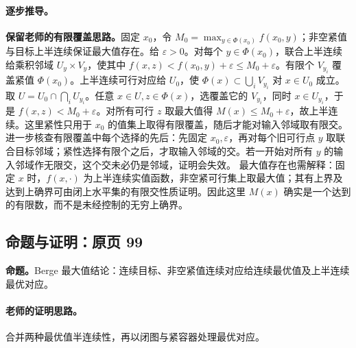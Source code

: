 \documentclass[11pt,a4paper]{article}
\newcommand{\eps}{\varepsilon}
\theoremstyle{definition}\newtheorem{definition}{定义}\newtheorem{example}{例}
\begin{document}
\paragraph{逐步推导。}\textbf{保留老师的有限覆盖思路。}固定 $x_0$，令 $M_0=\max_{y\in\Phi(x_0)}f(x_0,y)$；非空紧值与目标上半连续保证最大值存在。给 $\eps>0$。对每个 $y\in\Phi(x_0)$，联合上半连续给乘积邻域 $U_y\times V_y$，使其中 $f(x,z)<f(x_0,y)+\eps\le M_0+\eps$。有限个 $V_{y_i}$ 覆盖紧值 $\Phi(x_0)$。上半连续可行对应给 $U_0$，使 $\Phi(x)\subset\bigcup_iV_{y_i}$ 对 $x\in U_0$ 成立。取 $U=U_0\cap\bigcap_iU_{y_i}$。任意 $x\in U,z\in\Phi(x)$，选覆盖它的 $V_{y_i}$，同时 $x\in U_{y_i}$，于是 $f(x,z)<M_0+\eps$。对所有可行 $z$ 取最大值得 $M(x)\le M_0+\eps$，故上半连续。这里紧性只用于 $x_0$ 的值集上取得有限覆盖，随后才能对输入邻域取有限交。
进一步核查有限覆盖中每个选择的先后：先固定 $x_0,\eps$，再对每个旧可行点 $y$ 取联合目标邻域；紧性选择有限个之后，才取输入邻域的交。若一开始对所有 $y$ 的输入邻域作无限交，这个交未必仍是邻域，证明会失效。
最大值存在也需解释：固定 $x$ 时，$f(x,\cdot)$ 为上半连续实值函数，非空紧可行集上取最大值；其有上界及达到上确界可由闭上水平集的有限交性质证明。因此这里 $M(x)$ 确实是一个达到的有限数，而不是未经控制的无穷上确界。


\subsection{命题与证明：原页 99}

\textbf{命题。}Berge 最大值结论：连续目标、非空紧值连续对应给连续最优值及上半连续最优对应。

\paragraph{老师的证明思路。}合并两种最优值半连续性，再以闭图与紧容器处理最优对应。
\end{document}
